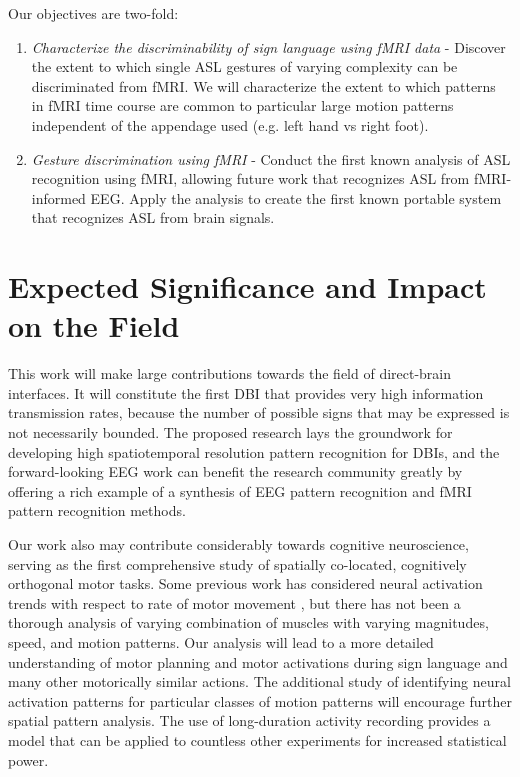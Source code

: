 \documentclass{proposal}
\begin{document}

Our objectives are two-fold:
\begin{enumerate}
\item \textit{Characterize the discriminability of sign language using fMRI data} - Discover the extent to which single ASL gestures of varying complexity can be discriminated from fMRI. We will characterize the extent to which patterns in fMRI time course are common to particular large motion patterns independent of the appendage used (e.g. left hand vs right foot).
\item \textit{Gesture discrimination using fMRI}
 - Conduct the first known analysis of ASL recognition using
fMRI, allowing future work that recognizes ASL from fMRI-informed EEG.
Apply the analysis to create the first known portable system that recognizes ASL from brain signals.
\end{enumerate}

\section{Expected Significance and Impact on the Field}
This work will make large contributions towards the field of direct-brain interfaces. It will constitute the first DBI that provides very high information transmission rates, because the number of possible signs that may be expressed is not necessarily bounded. The proposed research lays the groundwork for developing high spatiotemporal resolution pattern recognition for DBIs, and the forward-looking EEG work can benefit the research community greatly by offering a rich example of a synthesis of EEG pattern recognition and fMRI pattern recognition methods.

Our work also may contribute considerably towards cognitive neuroscience, serving as the first comprehensive study of spatially co-located, cognitively orthogonal motor tasks. Some previous work has considered neural activation trends with respect to rate of motor movement \cite{rao1996rbf}, but there has not been a thorough analysis of varying combination of muscles with varying magnitudes, speed, and motion patterns. Our analysis will lead to a more detailed understanding of motor planning and motor activations during sign language and many other motorically similar actions. The additional study of identifying neural activation patterns for particular classes of motion patterns will encourage further spatial pattern analysis. The use of long-duration activity recording provides a model that can be applied to countless other experiments for increased statistical power.
\end{document}
